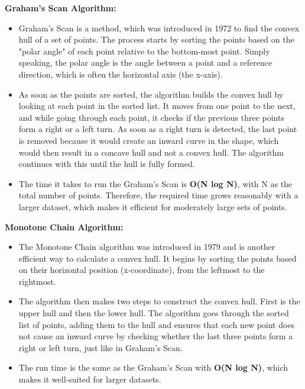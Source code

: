     \pagebreak

    \textbf{Graham's Scan Algorithm:} 
    \begin{itemize}
        \item Graham's Scan is a method, which was introduced in 1972 to find the convex hull of a set of points. The process starts by sorting the points based on the "polar angle" of each point relative to the bottom-most point. Simply speaking, the polar angle is the angle between a point and a reference direction, which is often the horizontal axis (the x-axis).
        \item As soon as the points are sorted, the algorithm builds the convex hull by looking at each point in the sorted list. It moves from one point to the next, and while going through each point, it checks if the previous three points form a right or a left turn. As soon as a right turn is detected, the last point is removed because it would create an inward curve in the shape, which would then result in a concave hull and not a convex hull. The algorithm continues with this until the hull is fully formed.
        \item The time it takes to run the Graham's Scan is \textbf{O(N log N)}, with N as the total number of points. Therefore, the required time grows reasonably with a larger dataset, which makes it efficient for moderately large sets of points.
    \end{itemize} 
    \autocite{Andi:typesOfConvexHullAlgos, Andi:convexHullPic} \newline \newline
    \textbf{Monotone Chain Algorithm:}
    \begin{itemize}
        \item The Monotone Chain algorithm was introduced in 1979 and is another efficient way to calculate a convex hull. It begins by sorting the points based on their horizontal position (x-coordinate), from the leftmost to the rightmost.
        \item The algorithm then makes two steps to construct the convex hull. First is the upper hull and then the lower hull. The algorithm goes through the sorted list of points, adding them to the hull and ensures that each new point does not cause an inward curve by checking whether the last three points form a right or left turn, just like in Graham's Scan.
        \item The run time is the same as the Graham's Scan with \textbf{O(N log N)}, which makes it well-suited for larger datasets.
    \end{itemize} \autocite{Andi:typesOfConvexHullAlgos, Andi:convexHullPic}

